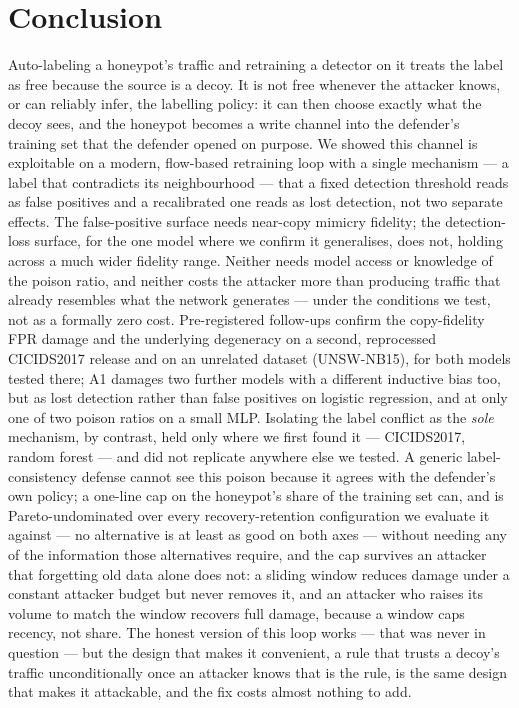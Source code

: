 \section{Conclusion}
\label{sec:conclusion}

Auto-labeling a honeypot's traffic and retraining a detector on it treats the label as free
because the source is a decoy. It is not free whenever the attacker knows, or can reliably
infer, the labelling policy: it can then choose exactly what the decoy sees, and the honeypot
becomes a write channel into the defender's training set that the defender opened on purpose. We
showed this channel is exploitable on a modern, flow-based retraining loop with a single
mechanism — a label that contradicts its neighbourhood — that a fixed detection threshold reads
as false positives and a recalibrated one reads as lost detection, not two separate effects. The
false-positive surface needs near-copy mimicry fidelity; the detection-loss surface, for the one
model where we confirm it generalises, does not, holding across a much wider fidelity range.
Neither needs model access or knowledge of the poison ratio, and neither costs the attacker more
than producing traffic that already resembles what the network generates — under the conditions
we test, not as a formally zero cost. Pre-registered follow-ups confirm the copy-fidelity FPR
damage and the underlying degeneracy on a second, reprocessed CICIDS2017 release and on an
unrelated dataset (UNSW-NB15), for both models tested there; A1 damages two further models with
a different inductive bias too, but as lost detection rather than false positives on logistic
regression, and at only one of two poison ratios on a small MLP. Isolating the label conflict as
the \emph{sole} mechanism, by contrast, held only where we first found it — CICIDS2017, random
forest — and did not replicate anywhere else we tested. A generic label-consistency defense
cannot see this poison
because it agrees with the defender's own policy; a one-line cap on the honeypot's share of the
training set can, and is Pareto-undominated over every recovery-retention configuration we
evaluate it against — no alternative is at least as good on both axes — without needing any of
the information those alternatives require, and the cap survives an attacker that forgetting old
data alone does not: a sliding window reduces damage under a constant attacker budget but never
removes it, and an attacker who raises its volume to match the window recovers full damage,
because a window caps recency, not share. The honest version of this loop works — that was
never in question — but the design that makes it convenient, a rule that trusts a decoy's
traffic unconditionally once an attacker knows that is the rule, is the same design that makes
it attackable, and the fix costs almost nothing to add.

